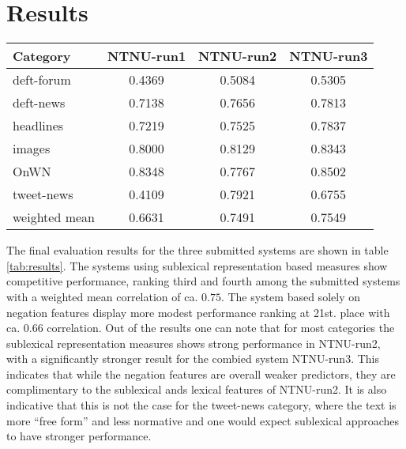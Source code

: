 
\section{Results}
\label{sec:results}

\begin{table*}
  \centering
  \begin{tabular}{|l|c|c|c|}
    \hline
    Category & NTNU-run1 & NTNU-run2 & NTNU-run3 \\
    \hline
    deft-forum & 0.4369 & 0.5084 & 0.5305 \\
    deft-news & 0.7138 & 0.7656 & 0.7813 \\
    headlines & 0.7219 & 0.7525 & 0.7837 \\
    images & 0.8000 & 0.8129 & 0.8343 \\
    OnWN & 0.8348 & 0.7767 & 0.8502 \\
    tweet-news & 0.4109 & 0.7921 & 0.6755	\\
    \hline
    weighted mean & 0.6631 & 0.7491 & 0.7549 \\
    \hline
  \end{tabular}
  \caption{Final evaluation results for the submitted systems.}
  \label{tab:results}
\end{table*}

The final evaluation results for the three submitted systems are shown in table \ref{tab:results}. The systems using sublexical representation based measures show competitive performance, ranking third and fourth among the submitted systems with a weighted mean correlation of ca. $0.75$. The system based solely on negation features display more modest performance ranking at 21st. place with ca. 0.66 correlation. Out of the results one can note that for most categories the sublexical representation measures shows strong performance in NTNU-run2, with a significantly stronger result for the combied system NTNU-run3. This indicates that while the negation features are overall weaker predictors, they are complimentary to the sublexical ands lexical features of NTNU-run2. It is also indicative that this is not the case for the tweet-news category, where the text is more ``free form'' and less normative and one would expect sublexical approaches to have stronger performance.

